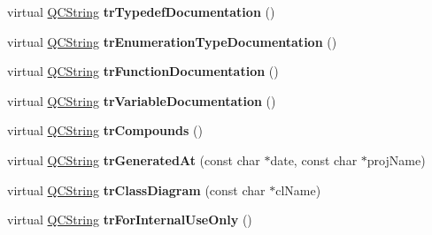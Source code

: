 \begin{DoxyCompactItemize}
\item 
\hypertarget{class_translator_chinese_a284d8febafa52e730c3f929a1f17f166}{virtual \hyperlink{class_q_c_string}{Q\-C\-String} {\bfseries tr\-Typedef\-Documentation} ()}\label{class_translator_chinese_a284d8febafa52e730c3f929a1f17f166}

\item 
\hypertarget{class_translator_chinese_a03114d3cc3330b921600693ad71adc2f}{virtual \hyperlink{class_q_c_string}{Q\-C\-String} {\bfseries tr\-Enumeration\-Type\-Documentation} ()}\label{class_translator_chinese_a03114d3cc3330b921600693ad71adc2f}

\item 
\hypertarget{class_translator_chinese_a8dc8036d97f4f5406392646044d5af7e}{virtual \hyperlink{class_q_c_string}{Q\-C\-String} {\bfseries tr\-Function\-Documentation} ()}\label{class_translator_chinese_a8dc8036d97f4f5406392646044d5af7e}

\item 
\hypertarget{class_translator_chinese_aa3ed4d30194d5ad2ae633df2d91e4bcd}{virtual \hyperlink{class_q_c_string}{Q\-C\-String} {\bfseries tr\-Variable\-Documentation} ()}\label{class_translator_chinese_aa3ed4d30194d5ad2ae633df2d91e4bcd}

\item 
\hypertarget{class_translator_chinese_a603472da4b3038d38d1f322fa07c580e}{virtual \hyperlink{class_q_c_string}{Q\-C\-String} {\bfseries tr\-Compounds} ()}\label{class_translator_chinese_a603472da4b3038d38d1f322fa07c580e}

\item 
\hypertarget{class_translator_chinese_a4fdf6d63541eaaa48cd09fd9ffdf2bec}{virtual \hyperlink{class_q_c_string}{Q\-C\-String} {\bfseries tr\-Generated\-At} (const char $\ast$date, const char $\ast$proj\-Name)}\label{class_translator_chinese_a4fdf6d63541eaaa48cd09fd9ffdf2bec}

\item 
\hypertarget{class_translator_chinese_a5650582c9e4157837fa0a32b75772947}{virtual \hyperlink{class_q_c_string}{Q\-C\-String} {\bfseries tr\-Class\-Diagram} (const char $\ast$cl\-Name)}\label{class_translator_chinese_a5650582c9e4157837fa0a32b75772947}

\item 
\hypertarget{class_translator_chinese_afd682dc33a99dbe52d3d56cace1a4378}{virtual \hyperlink{class_q_c_string}{Q\-C\-String} {\bfseries tr\-For\-Internal\-Use\-Only} ()}\label{class_translator_chinese_afd682dc33a99dbe52d3d56cace1a4378}


\end{DoxyCompactItemize}
